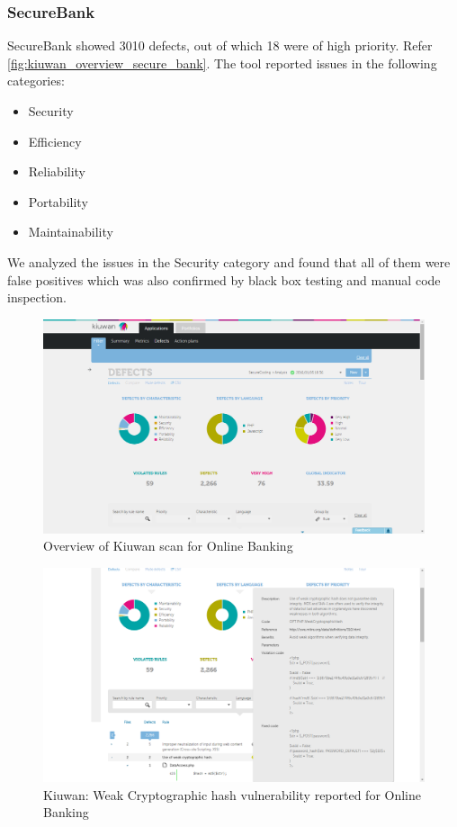 \subsubsection{SecureBank}
SecureBank showed 3010 defects, out of which 18 were of high priority. Refer \ref{fig:kiuwan_overview_secure_bank}. The tool reported issues in the following categories:
\begin{itemize}
    \item Security
    \item Efficiency
    \item Reliability
    \item Portability
    \item Maintainability
\end{itemize}
We analyzed the issues in the Security category and found that all of them were false positives which was also confirmed by black box testing and manual code inspection.

\begin{figure}[ht]
	\centering
	\includegraphics[width=.8\linewidth]{figures/kiuwan_overview.png}
	\caption{Overview of Kiuwan scan for Online Banking}
	\label{fig:kiuwan_overview}
\end{figure}

\begin{figure}[ht]
	\centering
	\includegraphics[width=.8\linewidth]{figures/kiuwan_weak_hash.png}
	\caption{Kiuwan: Weak Cryptographic hash vulnerability reported for Online Banking}
	\label{fig:kiuwan_weak_hash}
\end{figure}

